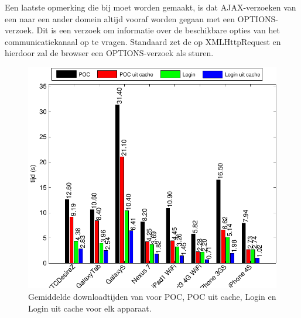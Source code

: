 Een laatste opmerking die bij \st{} moet worden gemaakt, is dat AJAX-verzoeken van een  naar een ander domein altijd vooraf worden gegaan met een OPTIONS-verzoek.
Dit is een verzoek om informatie over de beschikbare opties van het communicatiekanaal op te vragen.
Standaard zet \st{} de  op XMLHttpRequest en hierdoor zal de browser een OPTIONS-verzoek als  sturen.
% 

\begin{figure}[H]
  \centering
  \includegraphics[width=\textwidth]{figuren/performance-st.pdf}
  \caption{Gemiddelde downloadtijden van \st{} voor POC,  POC uit cache,  Login en Login uit cache voor elk apparaat.}
  \label{fig:performantie-st}
\end{figure}

